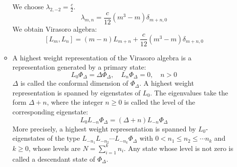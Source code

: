 \documentclass[12pt]{article}
\theoremstyle{definition}
\begin{document}
\begin{enumerate}
\begin{itemize}
\begin{equation}
    \end{equation}
    We choose $\lambda_{2,-2}=\frac{c}{2}$.
    \begin{equation}
        \lambda_{m,n}=\frac{c}{12}(m^3-m)\delta_{m+n,0}
    \end{equation}
    We obtain Virasoro algebra:
    \begin{equation}
        \boxed{[L_m,L_n]=(m-n)L_{m+n}+\frac{c}{12}(m^3-m)\delta_{m+n,0}}
    \end{equation}
    \item A highest weight representation of the Virasoro algebra is a representation generated by a primary state:
    \begin{equation}
        L_0\Phi_\Delta=\Delta\Phi_\Delta,\quad L_n\Phi_\Delta=0,\quad n>0
    \end{equation}
    $\Delta$ is called the conformal dimension of $\Phi_\Delta$. A highest weight representation is spanned by eigenstates of $L_0$. The eigenvalues take the form $\Delta+n$, where the integer $n\geq0$ is called the level of the corresponding eigenstate:
    \begin{equation}
        L_0L_{-n}\Phi_\Delta=(\Delta+n)L_{-n}\Phi_\Delta
    \end{equation}
    More precisely, a highest weight representation is spanned by $L_0$-eigenstates of the type $L_{-n_1}L_{-n_2}\cdots L_{-n_k}\Phi_\Delta$ with $0<n_1\leq n_2\leq \cdots n_k$ and $k\geq0$, whose levels are $N=\sum\limits_{{i=1}}^{k}n_{i}$. Any state whose level is not zero is called a descendant state of $\Phi_\Delta$.
    \end{itemize}
\end{enumerate}
\end{document}
